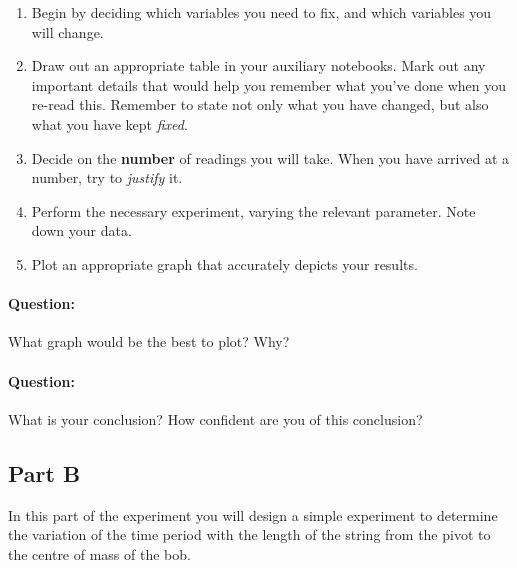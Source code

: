 \begin{enumerate}
    \item Begin by deciding which variables you need to fix, and which variables you will change.
    
    \item Draw out an appropriate table in your auxiliary notebooks. Mark out any important details that would help you remember what you've done when you re-read this. Remember to state not only what you have changed, but also what you have kept \textit{fixed}.
    
    \item Decide on the \textbf{number} of readings you will take. When you have arrived at a number, try to \textit{justify} it.
    
    \item Perform the necessary experiment, varying the relevant parameter. Note down your data.
    
    \item Plot an appropriate graph that accurately depicts your results.
\end{enumerate}

\begin{question}
\paragraph{Question:} What graph would be the best to plot? Why? ~\\

\paragraph{Question:} What is your conclusion? How confident are you of this conclusion?
\end{question}


\subsection{Part B}

In this part of the experiment you will design a simple experiment to determine the variation of the time period with the length of the string from the pivot to the centre of mass of the bob.

